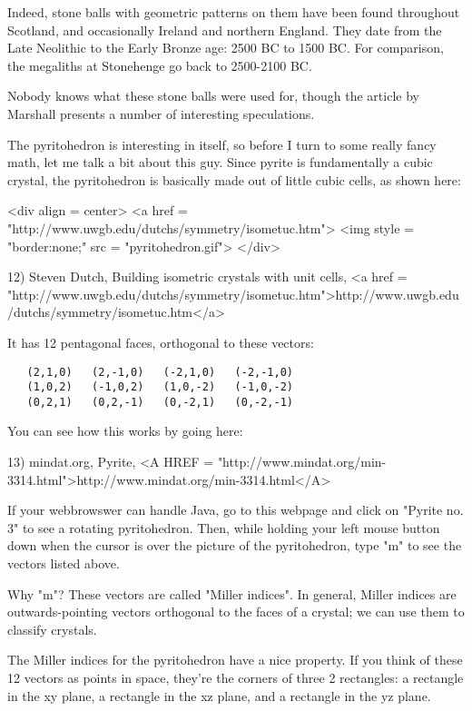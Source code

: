 Indeed, stone balls with geometric patterns on them have been found 
throughout Scotland, and occasionally Ireland and northern England.  
They date from the Late Neolithic to the Early Bronze age: 2500 BC to 
1500 BC.  For comparison, the megaliths at Stonehenge go back to
2500-2100 BC.  

Nobody knows what these stone balls were used for, though the article
by Marshall presents a number of interesting speculations.

The pyritohedron is interesting in itself, so before I turn to some
really fancy math, let me talk a bit about this guy.  Since pyrite is 
fundamentally a cubic crystal, the pyritohedron is basically made out 
of little cubic cells, as shown here:

<div align = center>
<a href = "http://www.uwgb.edu/dutchs/symmetry/isometuc.htm">
<img style = "border:none;" src = "pyritohedron.gif">
</div>

12) Steven Dutch, Building isometric crystals with unit cells, 
<a href = "http://www.uwgb.edu/dutchs/symmetry/isometuc.htm">http://www.uwgb.edu/dutchs/symmetry/isometuc.htm</a>

It has 12 pentagonal faces, orthogonal to these vectors:

\begin{verbatim}
   (2,1,0)   (2,-1,0)   (-2,1,0)   (-2,-1,0)
   (1,0,2)   (-1,0,2)   (1,0,-2)   (-1,0,-2)
   (0,2,1)   (0,2,-1)   (0,-2,1)   (0,-2,-1)
\end{verbatim}
    

You can see how this works by going here:

13) mindat.org, Pyrite, <A HREF = "http://www.mindat.org/min-3314.html">http://www.mindat.org/min-3314.html</A>

If your webbrowswer can handle Java, go to this webpage and click on
"Pyrite no. 3" to see a rotating pyritohedron.  Then, while
holding your left mouse button down when the cursor is over the
picture of the pyritohedron, type "m" to see the vectors
listed above.

Why "m"?  These vectors are called "Miller
indices".  In general, Miller indices are
outwards-pointing vectors orthogonal to the faces of a crystal; we can
use them to classify crystals.

The Miller indices for the pyritohedron have a nice property.  If you
think of these 12 vectors as points in space, they're the corners of
three 2 rectangles: a rectangle in the xy plane, a rectangle in the
xz plane, and a rectangle in the yz plane.  

